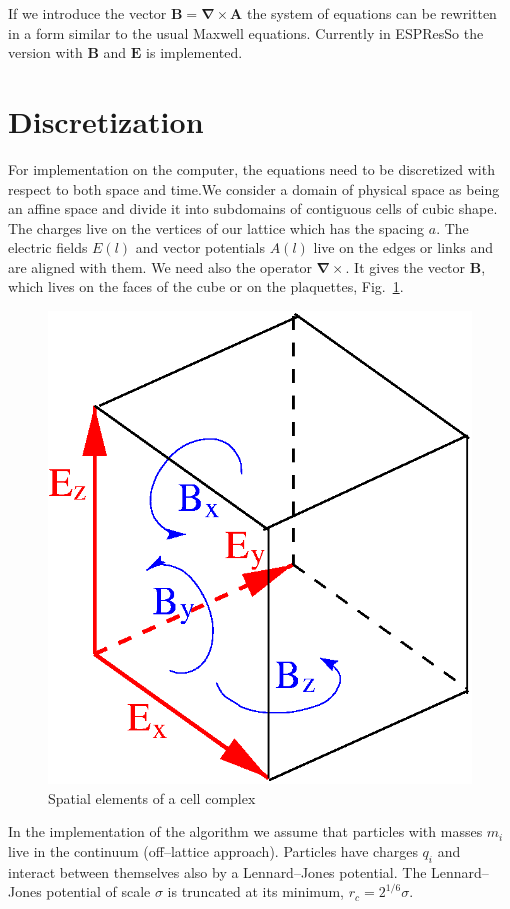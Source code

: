 \documentclass[a4paper, 12pt]{article}
\newcommand{\vect}[1]{\mathbf{#1}}
\newcommand{\curl}[1]{\vect{\nabla}\times\vect{#1}}
\def\es{{\sf ESPResSo}}             %
\begin{document}
If we introduce the vector $\vect B=\curl A$ the system of equations can be rewritten in a form similar to the usual Maxwell equations. Currently in {\es} the version with $\vect B$ and $\vect E$ is implemented.
%
\section{Discretization}
%
For implementation on the computer, the equations need to be
discretized with respect to both space and time.We consider a domain of physical space as being an
affine space and divide it into subdomains of contiguous cells of
cubic shape. The charges live on the vertices of our lattice which has
the spacing $a$. The electric fields $E(l)$ and vector potentials
$A(l)$ live on the edges or links and are aligned with them. We need
also the operator $\curl{}$. It gives the vector $\vect B$, which lives on the
faces of the cube or on the plaquettes, Fig.~\ref{fig:cell_structure}.
%
\begin{figure}
  \includegraphics[scale=0.55]{figs/cell.eps}
  \caption{Spatial elements of a cell complex}
  \label{fig:cell_structure}  
\end{figure}
%
In the implementation of the algorithm we assume that particles with
masses $m_i$ live in the continuum (off--lattice approach). Particles
have charges $q_i$ and interact between themselves also by a
Lennard--Jones potential. The Lennard--Jones potential of scale $\sigma$ is 
truncated at its minimum, $r_c=2^{1/6}\sigma$. 
\end{document}
